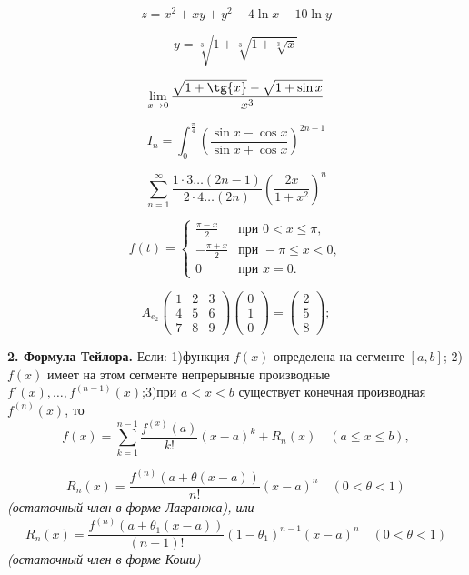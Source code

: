 \documentclass[a4paper, 12pt]{article}
\begin{document}
$$
z=x^2+xy+y^2-4\ln {x}-10\ln {y}
$$

$$
y=\sqrt[3]{1+\sqrt[3]{1+\sqrt[3]{x}}}
$$

$$
\lim_{x \to 0}\frac{\sqrt{\mathstrut 1+\tg{x}}-\sqrt{\mathstrut 1+\sin{x}}}{x^3}
$$

$$
I_n= \int_{0}^{\frac{\pi}{4}} \left(\frac{\sin{x}-\cos{x}}{\sin{x}+\cos{x}}\right)^{2n-1}
$$

$$
\sum \limits_{n=1}^\infty \frac{1\cdot3\ldots(2n-1)}{2\cdot4\ldots(2n)}\left(\frac{2x}{1+x^2}\right)^n
$$

$$
f{(t)}=\begin{cases}
\frac{\pi-x}{2} & \text{при } 0 < x \leqslant \pi, \\
-\frac{\pi+x}{2} & \text{при } -\pi \leqslant x < 0,  \\
0 & \text{при } x=0.
\end{cases}
$$

$$
A_{e_2} \begin{pmatrix}
1 & 2 & 3 \\
4 & 5 & 6 \\
7 & 8 & 9
\end{pmatrix}\begin{pmatrix}
0 \\
1 \\
0
\end{pmatrix}=\begin{pmatrix}
2 \\
5 \\
8
\end{pmatrix};
$$

\textbf{2. Формула Тейлора.} Если: 1)функция $f(x)$ определена на сегменте $[a,b]$; 2)$f(x)$ имеет на этом сегменте непрерывные производные $f'(x), \ldots, f^{(n-1)}(x)$;3)при $a<x<b$ существует конечная производная $f^{(n)}(x)$, то 
$$
f(x) = \sum \limits_{k=1}^{n-1} \frac{f^{(x)}(a)}{k!}\left(x-a\right)^k+R_n(x) \quad (a \leqslant x \leqslant b),
$$

$$
R_n(x)= \frac{f^{(n)}\left(a+\theta \left(x-a\right)\right)}{n!}\left(x-a\right)^n \quad (0<\theta<1)
$$
\it{(остаточный член в форме Лагранжа), или}\rm
$$
R_n(x)= \frac{f^{(n)}\left(a+\theta_1 \left(x-a\right)\right)}{(n-1)!}\left(1-\theta_1\right)^{n-1}\left(x-a\right)^n \quad (0<\theta<1)
$$
\it{(остаточный член в форме Коши)}\rm
\end{document}
